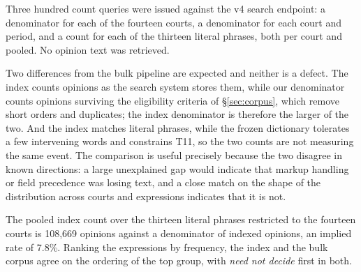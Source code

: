 Three hundred count queries were issued against the v4 search endpoint: a
denominator for each of the fourteen courts, a denominator for each court and
period, and a count for each of the thirteen literal phrases, both per court and
pooled. No opinion text was retrieved.

Two differences from the bulk pipeline are expected and neither is a defect.
The index counts opinions as the search system stores them, while our
denominator counts opinions surviving the eligibility criteria of
\S\ref{sec:corpus}, which remove short orders and duplicates; the index
denominator is therefore the larger of the two. And the index matches literal
phrases, while the frozen dictionary tolerates a few intervening words and
constrains T11, so the two counts are not measuring the same event. The
comparison is useful precisely because the two disagree in known directions: a
large unexplained gap would indicate that markup handling or field precedence
was losing text, and a close match on the shape of the distribution across
courts and expressions indicates that it is not.

The pooled index count over the thirteen literal phrases restricted to the
fourteen courts is 108{,}669 opinions against a denominator of
\ApiTotal{} indexed opinions, an implied rate of 7.8\%. Ranking the expressions
by frequency, the index and the bulk corpus agree on the ordering of the top
group, with \emph{need not decide} first in both.


